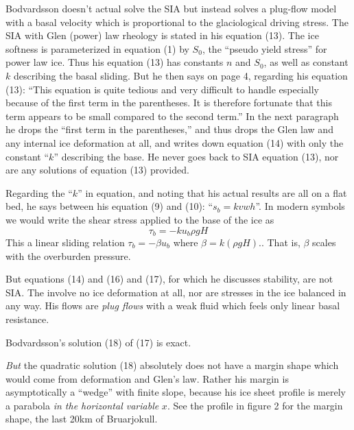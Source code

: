 \documentclass[twocolumn,letterpaper]{igs}
\begin{document}
Bodvardsson doesn't actual solve the SIA but instead solves a plug-flow model with a basal velocity which is proportional to the glaciological driving stress.  The SIA with Glen (power) law rheology is stated in his equation (13).  The ice softness is parameterized in equation (1) by $S_0$, the ``pseudo yield stress'' for power law ice.  Thus his equation (13) has constants $n$ and $S_0$, as well as constant $k$ describing the basal sliding.  But he then says on page 4, regarding his equation (13): ``This equation is quite tedious and very difficult to handle especially because of the first term in the parentheses.  It is therefore fortunate that this term appears to be small compared to the second term.''  In the next paragraph he drops the ``first term in the parentheses,'' and thus drops the Glen law and any internal ice deformation at all, and writes down equation (14) with only the constant ``$k$'' describing the base.  He never goes back to SIA equation (13), nor are any solutions of equation (13) provided.

Regarding the ``$k$'' in equation, and noting that his actual results are all on a flat bed, he says between his equation (9) and (10): ``$s_b = k v w h$''.  In modern symbols we would write the shear stress applied to the base of the ice as
  $$\tau_b = - k u_b \rho g H$$
This a linear sliding relation $\tau_b = - \beta u_b$ where $\beta = k (\rho g H).$.  That is, $\beta$ scales with the overburden pressure.

But equations (14) and (16) and (17), for which he discusses stability, are not SIA.  The involve no ice deformation at all, nor are stresses in the ice balanced in any way.  His flows are \emph{plug flows} with a weak fluid which feels only linear basal resistance.

Bodvardsson's solution (18) of (17) is exact.

\emph{But} the quadratic solution (18) absolutely does not have a margin
shape which would come from deformation and Glen's law.  Rather his
margin is asymptotically a ``wedge'' with finite slope, because his ice
sheet profile is merely a parabola \emph{in the horizontal variable} $x$.
See the profile in figure 2 for the margin shape, the last 20km of
Bruarjokull.
\end{document}
